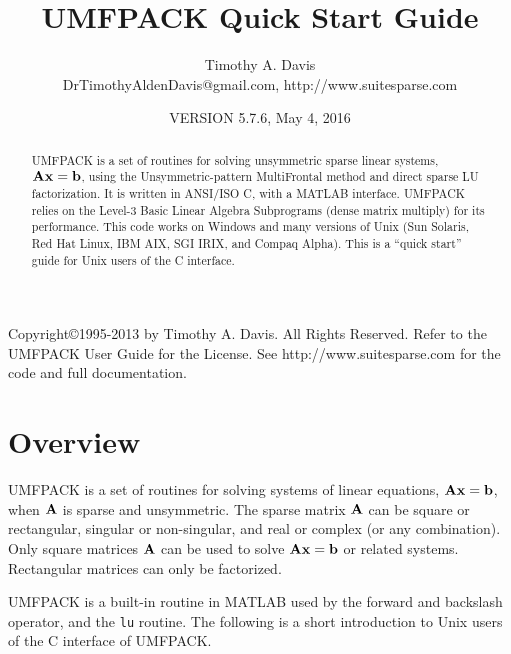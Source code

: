 \documentclass[11pt]{article}
\newcommand{\m}[1]{{\bf{#1}}}       %
\begin{document}
\author{Timothy A. Davis \\
DrTimothyAldenDavis@gmail.com, http://www.suitesparse.com}
\title{UMFPACK Quick Start Guide}
\date{VERSION 5.7.6, May 4, 2016}
\maketitle

\begin{abstract}
    UMFPACK is a set of routines for solving unsymmetric sparse linear
    systems, $\m{Ax}=\m{b}$, using the Unsymmetric-pattern MultiFrontal method
    and direct sparse LU factorization.  It is written in ANSI/ISO C, with a
    MATLAB interface.  UMFPACK relies on the Level-3
    Basic Linear Algebra Subprograms (dense matrix multiply) for its
    performance.  This code works on Windows and many versions of Unix (Sun
    Solaris, Red Hat Linux, IBM AIX, SGI IRIX, and Compaq Alpha).
    This is a ``quick start'' guide for Unix users of the C interface.
\end{abstract}

Copyright\copyright 1995-2013 by Timothy A. Davis.
All Rights Reserved.  Refer to the UMFPACK User Guide
for the License. See http://www.suitesparse.com
for the code and full documentation.

\section{Overview}

UMFPACK is a set of routines for solving systems of linear
equations, $\m{Ax}=\m{b}$, when $\m{A}$ is sparse and unsymmetric.
The sparse matrix $\m{A}$ can be square or rectangular, singular
or non-singular, and real or complex (or any combination).  Only square
matrices $\m{A}$ can be used to solve $\m{Ax}=\m{b}$ or related systems.
Rectangular matrices can only be factorized.

UMFPACK is a built-in routine in MATLAB used by the forward and
backslash operator, and the {\tt lu} routine.
The following is a short
introduction to Unix users of the C interface of UMFPACK.

\end{document}
